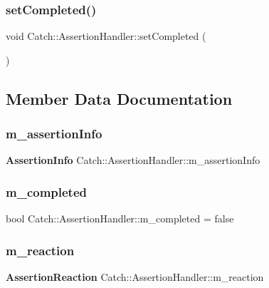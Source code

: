 \subsubsection{setCompleted()}
{\footnotesize\ttfamily void Catch\+::\+Assertion\+Handler\+::set\+Completed (\begin{DoxyParamCaption}{ }\end{DoxyParamCaption})}



\subsection{Member Data Documentation}
\mbox{\label{class_catch_1_1_assertion_handler_ad171e8724bb771d97949b7270f400303}} 
\subsubsection{m\_assertionInfo}
{\footnotesize\ttfamily \textbf{ Assertion\+Info} Catch\+::\+Assertion\+Handler\+::m\+\_\+assertion\+Info\hspace{0.3cm}{\ttfamily [private]}}

\mbox{\label{class_catch_1_1_assertion_handler_a5a756818dff781c155e8eb970d1d4c68}} 
\subsubsection{m\_completed}
{\footnotesize\ttfamily bool Catch\+::\+Assertion\+Handler\+::m\+\_\+completed = false\hspace{0.3cm}{\ttfamily [private]}}

\mbox{\label{class_catch_1_1_assertion_handler_a8203c08a43a3761b5f400ee6587fad55}} 
\subsubsection{m\_reaction}
{\footnotesize\ttfamily \textbf{ Assertion\+Reaction} Catch\+::\+Assertion\+Handler\+::m\+\_\+reaction\hspace{0.3cm}{\ttfamily [private]}}

